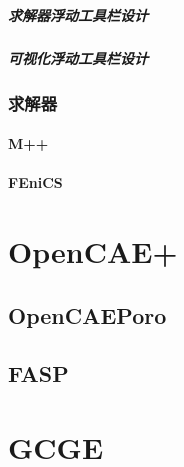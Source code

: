 \documentclass[letterpaper,10pt,english]{sphinxmanual}
\begin{document}
\paragraph{求解器浮动工具栏设计}
\label{\detokenize{src/fengsim/prepost:id6}}

\paragraph{可视化浮动工具栏设计}
\label{\detokenize{src/fengsim/prepost:id7}}
\sphinxstepscope


\subsection{求解器}
\label{\detokenize{src/fengsim/solver:id1}}\label{\detokenize{src/fengsim/solver::doc}}

\subsubsection{M++}
\label{\detokenize{src/fengsim/solver:m}}

\subsubsection{FEniCS}
\label{\detokenize{src/fengsim/solver:fenics}}
\sphinxstepscope


\chapter{OpenCAE+}
\label{\detokenize{src/opencaeplus/main:opencae}}\label{\detokenize{src/opencaeplus/main::doc}}

\section{OpenCAEPoro}
\label{\detokenize{src/opencaeplus/main:opencaeporo}}

\section{FASP}
\label{\detokenize{src/opencaeplus/main:fasp}}
\sphinxstepscope


\chapter{GCGE}
\label{\detokenize{src/gcge/main:gcge}}\label{\detokenize{src/gcge/main::doc}}
\end{document}
